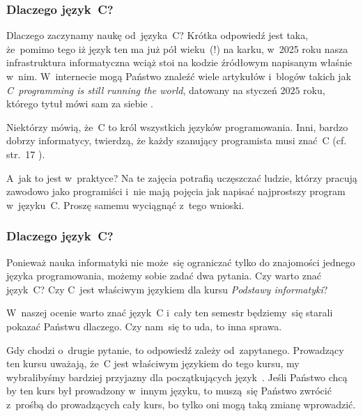 \documentclass[10pt,t]{beamer}
\begin{document}
\begin{frame}
  \frametitle{Dlaczego język~C?}


  Dlaczego zaczynamy naukę od~języka~C? Krótka odpowiedź jest taka,
  że~pomimo tego iż język ten ma już pół wieku~(!) na karku, w~2025 roku
  nasza infrastruktura informatyczna wciąż stoi na kodzie źródłowym
  napisanym właśnie w~nim. W~internecie mogą Państwo znaleźć wiele
  artykułów i~blogów takich jak
  {\textit{C~programming is still running the world}}, datowany na styczeń
  $2025$ roku, którego tytuł mówi sam za siebie
  \parencite{Scott-C-programming-is-still-ETC-Ver-2025}.

  Niektórzy mówią, że~C to król wszystkich języków programowania.
  Inni, bardzo dobrzy informatycy, twierdzą, że każdy szanujący
  programista musi znać~C (cf. str.~17
  \parencite{Hoey-Programowanie-w-asemblerze-x64-ETC-Pub-2024}).

  A~jak to jest w~praktyce? Na te zajęcia potrafią uczęszczać ludzie,
  którzy pracują zawodowo jako programiści i~nie mają pojęcia jak napisać
  najprostszy program w~języku~C. Proszę samemu wyciągnąć z~tego wnioski.

\end{frame}





\begin{frame}
  \frametitle{Dlaczego język~C?}


  Ponieważ nauka informatyki nie może~się ograniczać tylko do znajomości
  jednego języka programowania, możemy sobie zadać dwa pytania. Czy warto
  znać język~C? Czy C~jest właściwym językiem dla kursu \textit{Podstawy
    informatyki}?

  W~naszej ocenie warto znać język~C i~cały ten semestr będziemy~się
  starali pokazać Państwu dlaczego. Czy nam~się to uda, to inna sprawa.

  Gdy chodzi o~drugie pytanie, to odpowiedź zależy od~zapytanego. Prowadzący
  ten kursu uważają, że~C jest właściwym językiem do tego kursu, my
  wybralibyśmy bardziej przyjazny dla początkujących
  język~. Jeśli Państwo chcą by ten kurs był
  prowadzony w~innym języku, to muszą~się Państwo zwrócić z~prośbą do
  prowadzących cały kurs, bo tylko oni mogą taką zmianę wprowadzić.

\end{frame}
\end{document}
